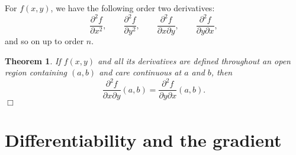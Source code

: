 \documentclass[letter-paper]{tufte-book}
\newtheorem{theorem}{\color{pastel-blue}Theorem}[section]
\newcommand{\dy}{\partial}
\newcommand{\ddy}[2]{\frac{\dy#1}{\dy#2}}
\newcommand{\qedwhite}{\hfill \ensuremath{\Box}}
\begin{document}
For $f(x,y)$, we have the following order two derivatives:
\begin{equation*}
  \ddy{^2 f}{x^2},\qquad \ddy{^2 f}{y^2},\qquad \ddy{^2 f}{x\dy y},\qquad
  \ddy{^2 f}{y\dy x},
\end{equation*}
and so on up to order $n$.
\begin{theorem}
  If $f(x,y)$ and all its derivatives are defined throughout an open region
  containing $(a,b)$ and care continuous at $a$ and $b$, then
  \begin{equation*}
    \ddy{^2 f}{x\dy y}(a,b)=\ddy{^2 f}{y\dy x}(a,b).
  \end{equation*}
  \qedwhite
\end{theorem}


\section{Differentiability and the gradient}
\end{document}
